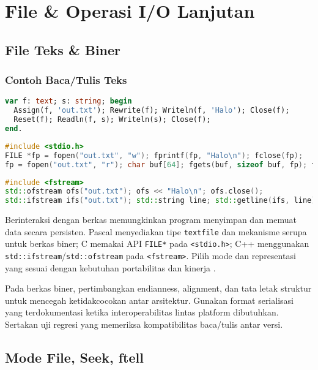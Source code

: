 \documentclass[../main.tex]{subfiles}
\begin{document}
\chapter{File \& Operasi I/O Lanjutan}
\section{File Teks \& Biner}
\subsection{Contoh Baca/Tulis Teks}
\begin{lstlisting}[language=Pascal, caption={Tulis dan baca file teks (Pascal)}]
var f: text; s: string; begin
  Assign(f, 'out.txt'); Rewrite(f); Writeln(f, 'Halo'); Close(f);
  Reset(f); Readln(f, s); Writeln(s); Close(f);
end.
\end{lstlisting}

\begin{lstlisting}[language=C, caption={Tulis dan baca file teks (C)}]
#include <stdio.h>
FILE *fp = fopen("out.txt", "w"); fprintf(fp, "Halo\n"); fclose(fp);
fp = fopen("out.txt", "r"); char buf[64]; fgets(buf, sizeof buf, fp); fclose(fp);
\end{lstlisting}

\begin{lstlisting}[language=C++, caption={fstream baca/tulis (C++)}]
#include <fstream>
std::ofstream ofs("out.txt"); ofs << "Halo\n"; ofs.close();
std::ifstream ifs("out.txt"); std::string line; std::getline(ifs, line);
\end{lstlisting}
Berinteraksi dengan berkas memungkinkan program menyimpan dan memuat data secara persisten. Pascal menyediakan tipe \texttt{textfile} dan mekanisme serupa untuk berkas biner; C memakai API \texttt{FILE*} pada \texttt{<stdio.h>}; C++ menggunakan \texttt{std::ifstream}/\texttt{std::ofstream} pada \texttt{<fstream>}. Pilih mode dan representasi yang sesuai dengan kebutuhan portabilitas dan kinerja \parencite{free-pascal-docs,gnu-c-manual,cpp-reference}.

Pada berkas biner, pertimbangkan endianness, alignment, dan tata letak struktur untuk mencegah ketidakcocokan antar arsitektur. Gunakan format serialisasi yang terdokumentasi ketika interoperabilitas lintas platform dibutuhkan. Sertakan uji regresi yang memeriksa kompatibilitas baca/tulis antar versi.

\section{Mode File, Seek, ftell}
\end{document}
